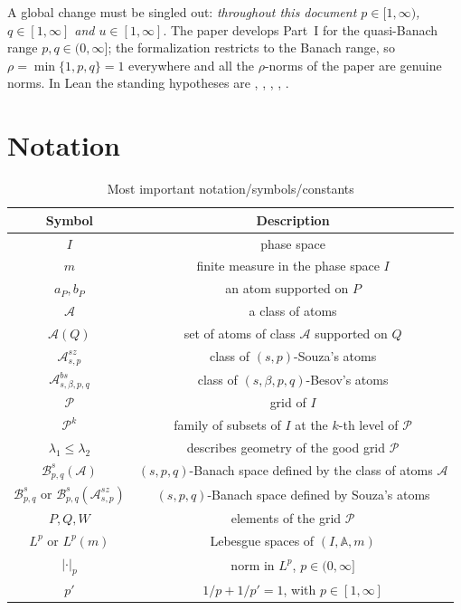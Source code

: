 \documentclass[11pt]{amsart}
\theoremstyle{definition}
\newcommand{\lean}[1]{\ifmmode\mbox{\leanname{#1}}\else\hspace{0pt}\leanname{#1}\fi}
\begin{document}
A global change must be singled out: \emph{throughout this document
$p \in [1,\infty)$, $q \in [1,\infty]$ and $u \in [1,\infty]$}. The paper
develops Part~I for the quasi-Banach range $p,q \in (0,\infty]$; the
formalization restricts to the Banach range, so $\rho=\min\{1,p,q\}=1$
everywhere and all the $\rho$-norms of the paper are genuine norms. In Lean
the standing hypotheses are \lean{1 <= p}, \lean{p != \(\infty\)},
\lean{Fact (1 <= q)}, \lean{1 <= u}, \lean{0 < s}.

\section{Notation}

\begin{table}[h]
  \centering
  \caption{Most important notation/symbols/constants}
  \label{tab:table1}
  \begin{tabular}{cc}
    \toprule
    Symbol & Description\\
    \midrule
    $I$ & phase space\\
    $m$ & finite measure in the phase space $I$\\
    $a_P, b_P$ & an atom supported on $P$\\
    $\mathcal{A}$ & a class of atoms \\
    $\mathcal{A}(Q)$ & set of atoms of class $\mathcal{A}$ supported on $Q$ \\
    $\mathcal{A}^{sz}_{s,p}$& class of $(s,p)$-Souza's atoms \\
    $\mathcal{A}^{bs}_{s,\beta,p,q}$ & class of $(s,\beta,p,q)$-Besov's atoms \\
    $\mathcal{P}$ & grid of $I$\\
    $\mathcal{P}^k$ & family of subsets of $I$ at the $k$-th level of $\mathcal{P}$\\
    $\lambda_1 \leq \lambda_2$ & describes geometry of the good grid $\mathcal{P}$\\
    $\mathcal{B}^s_{p,q}(\mathcal{A})$ & $(s,p,q)$-Banach space defined by the class of atoms $\mathcal{A}$\\
    $\mathcal{B}^s_{p,q}$ or $\mathcal{B}^s_{p,q}(\mathcal{A}^{sz}_{s,p})$ & $(s,p,q)$-Banach space defined by Souza's atoms\\
    $P, Q, W$ & elements of the grid $\mathcal{P}$\\
    $L^p$ or $L^p(m)$ & Lebesgue spaces of $(I,\mathbb{A}, m)$ \\
    $|\cdot|_p$ & norm in $L^p$, $p \in (0,\infty]$ \\
    $p'$ & $1/p+1/p'=1$, with $p\in [1,\infty]$ \\
    \bottomrule
  \end{tabular}
\end{table}
\end{document}
